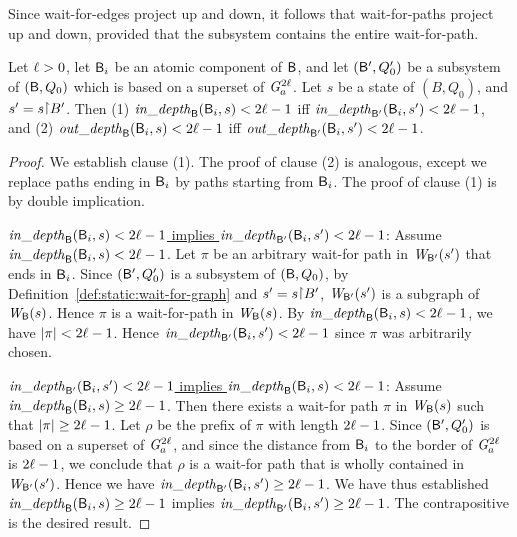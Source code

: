 



Since wait-for-edges project up and down, it follows that wait-for-paths
project up and down, provided that the subsystem contains the entire wait-for-path.

\begin{proposition} \label{prop:in-out-projection}
Let $\ell > 0$, let $\mathsf{B}_i$ be an atomic component of $\mathsf{B}$, and let 
$(\mathsf{B}', Q'_0)$ be a subsystem of $(\mathsf{B}, Q_0)$ which is based on a superset of $\mathit{G}_{a}^{2\ell}$.
Let $s$ be a state of $(B, Q_0)$, and $s' = s \pj B'$. Then
(1) $\mathit{in\_depth}_{\mathsf{B}}({\mathsf{B}_i, s}) < 2\ell-1$ iff $\mathit{in\_depth}_{\mathsf{B}'}({\mathsf{B}_i, s'}) < 2\ell-1$, and
(2) $\mathit{out\_depth}_{\mathsf{B}}({\mathsf{B}_i, s}) < 2\ell-1$ iff $\mathit{out\_depth}_{\mathsf{B}'}({\mathsf{B}_i, s'}) < 2\ell-1$.
\end{proposition}
%
%
\begin{proof}
We establish clause (1). The proof of clause (2) is analogous, except we replace paths ending in
$\mathsf{B}_i$ by paths starting from $\mathsf{B}_i$.
The proof of clause (1) is by double implication.



\ul{$\mathit{in\_depth}_{\mathsf{B}}({\mathsf{B}_i, s}) < 2\ell-1$ implies $\mathit{in\_depth}_{\mathsf{B}'}({\mathsf{B}_i, s'}) < 2\ell-1$}:
%
Assume $\mathit{in\_depth}_{\mathsf{B}}({\mathsf{B}_i, s}) < 2\ell-1$.
Let $\pi$ be an arbitrary wait-for path in $\mathit{W}_{\mathsf{B}'}({s'})$ that ends in $\mathsf{B}_i$. 
%
Since $(\mathsf{B}', Q'_0)$ is a subsystem of $(\mathsf{B}, Q_0)$, by Definition~\ref{def:static:wait-for-graph} and $s' = s \pj B'$,
$\mathit{W}_{\mathsf{B}'}({s'})$ is a subgraph of $\mathit{W}_{\mathsf{B}}({s})$.
%
Hence $\pi$ is a wait-for-path in $\mathit{W}_{\mathsf{B}}({s})$.
By $\mathit{in\_depth}_{\mathsf{B}}({\mathsf{B}_i, s}) < 2\ell-1$, we have $|\pi| < 2\ell-1$. 
Hence $\mathit{in\_depth}_{\mathsf{B}'}({\mathsf{B}_i, s'}) < 2\ell-1$ since $\pi$ was arbitrarily chosen.




\ul{$\mathit{in\_depth}_{\mathsf{B}'}({\mathsf{B}_i, s'}) < 2\ell-1$ implies $\mathit{in\_depth}_{\mathsf{B}}({\mathsf{B}_i, s}) < 2\ell-1$}:
%
Assume $\mathit{in\_depth}_{\mathsf{B}}({\mathsf{B}_i, s}) \ge 2\ell-1$. Then there exists a wait-for path $\pi$ in $\mathit{W}_{\mathsf{B}}({s})$ such that 
$|\pi| \ge 2\ell-1$. Let $\rho$ be the prefix of $\pi$ with length $2\ell-1$. 
%
Since $(\mathsf{B}', Q'_0)$ is based on a superset of $\mathit{G}_{a}^{2\ell}$, and since the distance from $\mathsf{B}_i$ to the border of 
$\mathit{G}_{a}^{2\ell}$ is $2\ell-1$, we conclude that $\rho$ is a wait-for path
that is wholly contained in $\mathit{W}_{\mathsf{B}'}({s'})$. Hence we have $\mathit{in\_depth}_{\mathsf{B}'}({\mathsf{B}_i, s'}) \ge 2\ell-1$.
%
We have thus established 
$\mathit{in\_depth}_{\mathsf{B}}({\mathsf{B}_i, s}) \ge 2\ell-1$ implies $\mathit{in\_depth}_{\mathsf{B}'}({\mathsf{B}_i, s'}) \ge 2\ell-1$.
The contrapositive is the desired result.
\end{proof}


